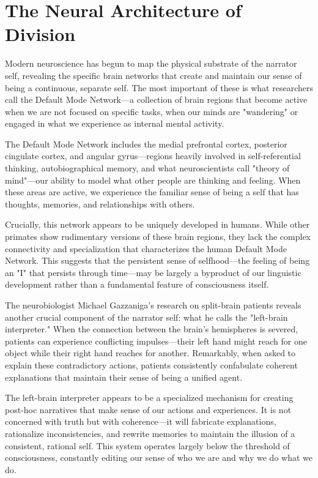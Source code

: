 \section{The Neural Architecture of Division}

Modern neuroscience has begun to map the physical substrate of the narrator self, revealing the specific brain networks that create and maintain our sense of being a continuous, separate self. The most important of these is what researchers call the Default Mode Network—a collection of brain regions that become active when we are not focused on specific tasks, when our minds are "wandering" or engaged in what we experience as internal mental activity.

The Default Mode Network includes the medial prefrontal cortex, posterior cingulate cortex, and angular gyrus—regions heavily involved in self-referential thinking, autobiographical memory, and what neuroscientists call "theory of mind"—our ability to model what other people are thinking and feeling. When these areas are active, we experience the familiar sense of being a self that has thoughts, memories, and relationships with others.

Crucially, this network appears to be uniquely developed in humans. While other primates show rudimentary versions of these brain regions, they lack the complex connectivity and specialization that characterizes the human Default Mode Network. This suggests that the persistent sense of selfhood—the feeling of being an "I" that persists through time—may be largely a byproduct of our linguistic development rather than a fundamental feature of consciousness itself.

The neurobiologist Michael Gazzaniga's research on split-brain patients reveals another crucial component of the narrator self: what he calls the "left-brain interpreter." When the connection between the brain's hemispheres is severed, patients can experience conflicting impulses—their left hand might reach for one object while their right hand reaches for another. Remarkably, when asked to explain these contradictory actions, patients consistently confabulate coherent explanations that maintain their sense of being a unified agent.

The left-brain interpreter appears to be a specialized mechanism for creating post-hoc narratives that make sense of our actions and experiences. It is not concerned with truth but with coherence—it will fabricate explanations, rationalize inconsistencies, and rewrite memories to maintain the illusion of a consistent, rational self. This system operates largely below the threshold of consciousness, constantly editing our sense of who we are and why we do what we do.

